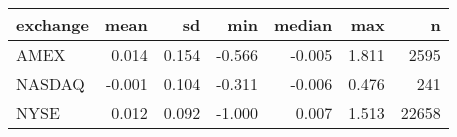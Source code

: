 
\begin{tabular}{lrrrrrr}
\toprule
exchange & mean & sd & min & median & max & n\\
\midrule
AMEX & 0.014 & 0.154 & -0.566 & -0.005 & 1.811 & 2595\\
NASDAQ & -0.001 & 0.104 & -0.311 & -0.006 & 0.476 & 241\\
NYSE & 0.012 & 0.092 & -1.000 & 0.007 & 1.513 & 22658\\
\bottomrule
\end{tabular}
